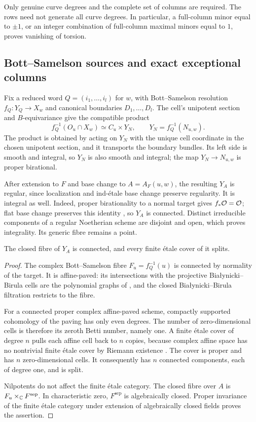 Only genuine curve degrees and the complete set of columns are required. The rows need not generate all curve degrees. In particular, a full-column minor equal to $\pm1$, or an integer combination of full-column maximal minors equal to $1$, proves vanishing of torsion.

\subsection{Bott--Samelson sources and exact exceptional columns}\label{tor:sources}
Fix a reduced word $Q=(i_1,\ldots,i_l)$ for $w$, with Bott--Samelson resolution $f_Q:Y_Q\longrightarrow X_w$ and canonical boundaries $D_1,\ldots,D_l$. The cell's unipotent section and $B$-equivariance give the compatible product
\[
 f_Q^{-1}(O_u\cap X_w)\simeq C_u\times Y_N,
 \qquad Y_N=f_Q^{-1}(N_{u,w}).
\]
The product is obtained by acting on $Y_N$ with the unique cell coordinate in the chosen unipotent section, and it transports the boundary bundles. Its left side is smooth and integral, so $Y_N$ is also smooth and integral; the map $Y_N\longrightarrow N_{u,w}$ is proper birational.

After extension to $F$ and base change to $A=A_F(u,w)$, the resulting $Y_A$ is regular, since localization and ind-\'etale base change preserve regularity. It is integral as well. Indeed, proper birationality to a normal target gives $f_*\mathcal O=\mathcal O$; flat base change preserves this identity \cite[Tag~02KH]{The26}, so $Y_A$ is connected. Distinct irreducible components of a regular Noetherian scheme are disjoint and open, which proves integrality. Its generic fibre remains a point.

\begin{lemma}\label{tor:fibre}
The closed fibre of $Y_A$ is connected, and every finite \'etale cover of it splits.
\end{lemma}
\begin{proof}
The complex Bott--Samelson fibre $F_u=f_Q^{-1}(u)$ is connected by normality of the target. It is affine-paved: its intersections with the projective Bia\l ynicki--Birula cells are the polynomial graphs of \cite[Proposition~2.1]{Ha04}, and the closed Bia\l ynicki--Birula filtration restricts to the fibre.

For a connected proper complex affine-paved scheme, compactly supported cohomology of the paving has only even degrees. The number of zero-dimensional cells is therefore its zeroth Betti number, namely one. A finite \'etale cover of degree $n$ pulls each affine cell back to $n$ copies, because complex affine space has no nontrivial finite \'etale cover by Riemann existence \cite[Expos\'e~XII, Theorem~5.1]{Gro71}. The cover is proper and has $n$ zero-dimensional cells. It consequently has $n$ connected components, each of degree one, and is split.

Nilpotents do not affect the finite \'etale category. The closed fibre over $A$ is $F_u\times_{\mathbb C}F^{\mathrm{sep}}$. In characteristic zero, $F^{\mathrm{sep}}$ is algebraically closed. Proper invariance of the finite \'etale category under extension of algebraically closed fields \cite[Tag~0A49]{The26} proves the assertion.
\end{proof}

